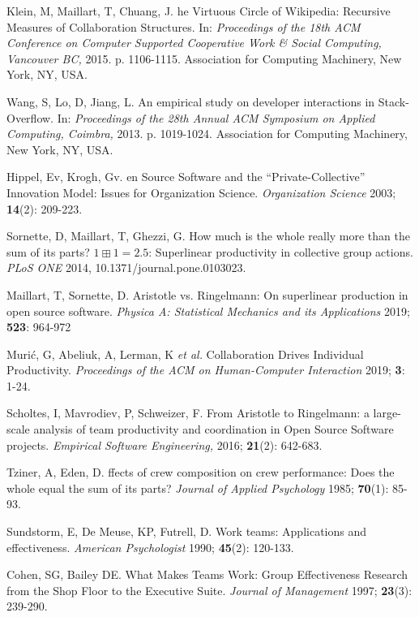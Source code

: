 \documentclass[unnumsec,webpdf,contemporary,large]{oup-authoring-template}%
\theoremstyle{thmstyleone}%
\theoremstyle{thmstyletwo}%
\theoremstyle{thmstylethree}%
\begin{document}
\begin{thebibliography}{10}
Klein, M, Maillart, T, Chuang, J. he Virtuous Circle of Wikipedia: Recursive Measures of Collaboration Structures. In: {\em Proceedings of the 18th ACM Conference on Computer Supported Cooperative Work \& Social Computing, Vancouver BC,} 2015. p. 1106-1115. Association for Computing Machinery, New York, NY, USA.

Wang, S, Lo, D, Jiang, L. An empirical study on developer interactions in Stack-Overflow. In: {\em Proceedings of the 28th Annual ACM Symposium on Applied Computing, 	Coimbra,} 2013. p. 1019-1024. Association for Computing Machinery, New York, NY, USA. 

Hippel, Ev, Krogh, Gv. en Source Software and the “Private-Collective” Innovation Model: Issues for Organization Science. {\em Organization Science} 2003; {\bf 14}(2): 209-223.

Sornette, D, Maillart, T, Ghezzi, G. How much is the whole really more than the
sum of its parts? $1 \boxplus 1 = 2.5$: Superlinear productivity in collective group actions. {\em PLoS ONE} 2014, 10.1371/journal.pone.0103023.

Maillart, T, Sornette, D. Aristotle vs. Ringelmann: On superlinear production in open source software. {\em Physica A: Statistical Mechanics and its Applications} 2019; {\bf 523}: 964-972

Muri\'c, G, Abeliuk, A, Lerman, K {\em et al.} Collaboration Drives Individual Productivity. {\em Proceedings of the ACM on Human-Computer Interaction} 2019; {\bf 3}: 1-24.

Scholtes, I, Mavrodiev, P, Schweizer, F. From Aristotle to Ringelmann: a large-scale analysis of team productivity and coordination in Open Source Software projects. {\em Empirical Software Engineering,} 2016; {\bf 21}(2): 642-683.

Tziner, A, Eden, D. ffects of crew composition on crew performance: Does the whole equal the sum of its parts? {\em Journal of Applied Psychology} 1985; {\bf 70}(1): 85-93.

Sundstorm, E, De Meuse, KP, Futrell, D. Work teams: Applications and effectiveness. {\em American Psychologist} 1990; {\bf 45}(2): 120-133.

Cohen, SG, Bailey DE. What Makes Teams Work: Group Effectiveness Research from the Shop Floor to the Executive Suite. {\em Journal of Management} 1997; {\bf 23}(3): 239-290.


\end{thebibliography}
\end{document}
